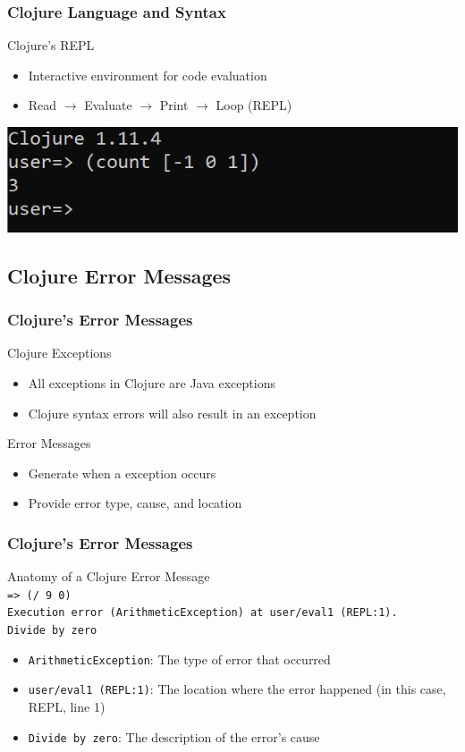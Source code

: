 \documentclass{beamer}
\newcommand{\comment}[1]{{\bf \tt  {#1}}}
\newcommand{\emcomment}[1]{\textcolor{ForestGreen}{\comment{Elena: {#1}}}}
\begin{document}
\begin{frame}
  \frametitle{Clojure Language and Syntax}
  Clojure's REPL
  \begin{itemize}
    \item Interactive environment for code evaluation
    \item Read \(\rightarrow\) Evaluate \(\rightarrow\) Print \(\rightarrow\) Loop (REPL)
  \end{itemize}
  \includegraphics{../resources/cljScreenshot.JPG}  
\end{frame}

\subsection{Clojure Error Messages}
\begin{frame}
  \frametitle{Clojure's Error Messages}
  Clojure Exceptions
  \begin{itemize}
    \item All exceptions in Clojure are Java exceptions
    \item Clojure syntax errors will also result in an exception %
  \end{itemize}
  Error Messages
  \begin{itemize}
    \item Generate when a exception occurs
    \item Provide error type, cause, and location
  \end{itemize}
\end{frame}

\begin{frame}
    \frametitle{Clojure's Error Messages}
    Anatomy of a Clojure Error Message \\
    \texttt{=> (/ 9 0)} \\
    \texttt{Execution error (ArithmeticException) at user/eval1 (REPL:1).} \\
    \texttt{Divide by zero}
    \begin{itemize}
      \item \texttt{ArithmeticException}: The type of error that occurred
      \item \texttt{user/eval1 (REPL:1)}: The location where the error happened (in this case, REPL, line 1)
      \item \texttt{Divide by zero}: The description of the error's cause
    \end{itemize}
\end{frame}
\end{document}
